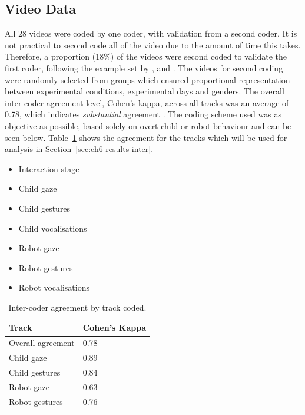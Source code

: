 \subsection{Video Data} \label{sec:ch6-meth-intdata}
All 28 videos were coded by one coder, with validation from a second coder. It is not practical to second code all of the video due to the amount of time this takes. Therefore, a proportion (18\%) of the videos were second coded to validate the first coder, following the example set by \cite{moshkina2014social}, \cite{nalin2012children} and \cite{stanton2008robotic}. The videos for second coding were randomly selected from groups which ensured proportional representation between experimental conditions, experimental days and genders. The overall inter-coder agreement level, Cohen's kappa, across all tracks was an average of 0.78, which indicates \textit{substantial} agreement \citep{landis1977measurement}. The coding scheme used was as objective as possible, based solely on overt child or robot behaviour and can be seen below. Table~\ref{tab:ch6-coderagree} shows the agreement for the tracks which will be used for analysis in Section~\ref{sec:ch6-results-inter}.

\begin{itemize}
	\itemsep-0.2em
	\item Interaction stage
	\item Child gaze
	\item Child gestures
	\item Child vocalisations
	\item Robot gaze
	\item Robot gestures
	\item Robot vocalisations
\end{itemize}

\begin{table}[t!]
	\centering
	\renewcommand{\arraystretch}{1.2} 
	\begin{tabular}{@{}p{4.5cm}p{3cm}@{}}
	\toprule
	\textbf{Track} 			& \textbf{Cohen's Kappa} \\ \midrule
	Overall agreement 	& 0.78\\
	Child gaze 				& 0.89\\
	Child gestures 			& 0.84\\
	Robot gaze 				& 0.63\\
	Robot gestures 		& 0.76\\ \bottomrule
	\end{tabular}
	\caption{Inter-coder agreement by track coded.}
	\label{tab:ch6-coderagree}
\end{table}

